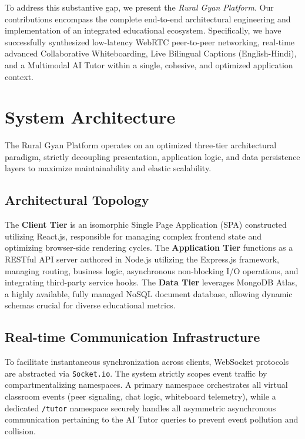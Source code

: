 \documentclass[12pt, journal, onecolumn]{IEEEtran}
\begin{document}
To address this substantive gap, we present the \textit{Rural Gyan Platform}. Our contributions encompass the complete end-to-end architectural engineering and implementation of an integrated educational ecosystem. Specifically, we have successfully synthesized low-latency WebRTC peer-to-peer networking, real-time advanced Collaborative Whiteboarding, Live Bilingual Captions (English-Hindi), and a Multimodal AI Tutor within a single, cohesive, and optimized application context.

\section{System Architecture}
The Rural Gyan Platform operates on an optimized three-tier architectural paradigm, strictly decoupling presentation, application logic, and data persistence layers to maximize maintainability and elastic scalability.

\subsection{Architectural Topology}
The \textbf{Client Tier} is an isomorphic Single Page Application (SPA) constructed utilizing React.js, responsible for managing complex frontend state and optimizing browser-side rendering cycles. The \textbf{Application Tier} functions as a RESTful API server authored in Node.js utilizing the Express.js framework, managing routing, business logic, asynchronous non-blocking I/O operations, and integrating third-party service hooks. The \textbf{Data Tier} leverages MongoDB Atlas, a highly available, fully managed NoSQL document database, allowing dynamic schemas crucial for diverse educational metrics. 

\subsection{Real-time Communication Infrastructure}
To facilitate instantaneous synchronization across clients, WebSocket protocols are abstracted via \texttt{Socket.io}. The system strictly scopes event traffic by compartmentalizing namespaces. A primary namespace orchestrates all virtual classroom events (peer signaling, chat logic, whiteboard telemetry), while a dedicated \texttt{/tutor} namespace securely handles all asymmetric asynchronous communication pertaining to the AI Tutor queries to prevent event pollution and collision.
\end{document}
